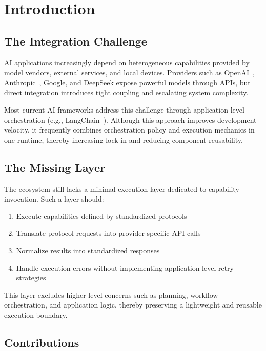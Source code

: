 \section{Introduction}

\subsection{The Integration Challenge}

AI applications increasingly depend on heterogeneous capabilities provided by model vendors, external services, and local devices. Providers such as OpenAI~\cite{openai2023}, Anthropic~\cite{anthropic2024}, Google, and DeepSeek expose powerful models through APIs, but direct integration introduces tight coupling and escalating system complexity.

Most current AI frameworks address this challenge through application-level orchestration (e.g., LangChain~\cite{langchain2024}). Although this approach improves development velocity, it frequently combines orchestration policy and execution mechanics in one runtime, thereby increasing lock-in and reducing component reusability.

\subsection{The Missing Layer}

The ecosystem still lacks a minimal execution layer dedicated to capability invocation. Such a layer should:
\begin{enumerate}[label=\arabic*.]
    \item Execute capabilities defined by standardized protocols
    \item Translate protocol requests into provider-specific API calls
    \item Normalize results into standardized responses
    \item Handle execution errors without implementing application-level retry strategies
\end{enumerate}

This layer excludes higher-level concerns such as planning, workflow orchestration, and application logic, thereby preserving a lightweight and reusable execution boundary.

\subsection{Contributions}


